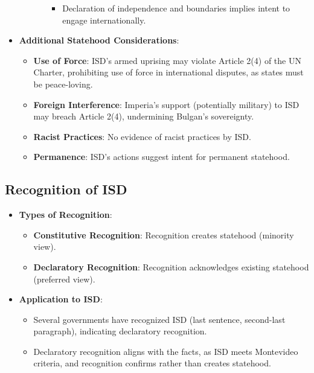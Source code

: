 \begin{itemize}
\begin{itemize}
\begin{itemize}
\begin{itemize}
                \item Declaration of independence and boundaries implies intent to engage internationally.
            \end{itemize}
        \end{itemize}
    \end{itemize}
    \item \textbf{Additional Statehood Considerations}:
    \begin{itemize}
        \item \textbf{Use of Force}: ISD’s armed uprising may violate Article 2(4) of the UN Charter, prohibiting use of force in international disputes, as states must be peace-loving.
        \item \textbf{Foreign Interference}: Imperia’s support (potentially military) to ISD may breach Article 2(4), undermining Bulgan’s sovereignty.
        \item \textbf{Racist Practices}: No evidence of racist practices by ISD.
        \item \textbf{Permanence}: ISD’s actions suggest intent for permanent statehood.
    \end{itemize}
\end{itemize}

\subsection{Recognition of ISD}
\begin{itemize}
    \item \textbf{Types of Recognition}:
    \begin{itemize}
        \item \textbf{Constitutive Recognition}: Recognition creates statehood (minority view).
        \item \textbf{Declaratory Recognition}: Recognition acknowledges existing statehood (preferred view).
    \end{itemize}
    \item \textbf{Application to ISD}:
    \begin{itemize}
        \item Several governments have recognized ISD (last sentence, second-last paragraph), indicating declaratory recognition.
        \item Declaratory recognition aligns with the facts, as ISD meets Montevideo criteria, and recognition confirms rather than creates statehood.
    \end{itemize}
\end{itemize}

